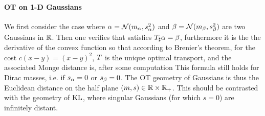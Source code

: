 %




\paragraph{OT on 1-D Gaussians}

We first consider the case where $\alpha = \mathcal{N}(m_\alpha,s_\alpha^2)$ and $\beta = \mathcal{N}(m_\beta,s_\beta^2)$ are two Gaussians in $\mathbb{R}$. 
%
Then one verifies that 
satisfies $T_\sharp \alpha=\beta$, furthermore it is the the derivative of the convex function 
so that according to Brenier's theorem, for the cost $c(x-y)=(x-y)^2$, $T$ is the unique optimal transport, and the associated Monge distance is, after some computation
This formula still holds for Dirac masses, i.e. if $s_\alpha=0$ or $s_\beta=0$.
%
The OT geometry of Gaussians is thus the Euclidean distance on the half plane $(m,s) \in \mathbb{R} \times \mathbb{R}_+$.
%
This should be contrasted with the geometry of $\operatorname{KL}$, where singular Gaussians (for which $s=0$) are infinitely distant. 

